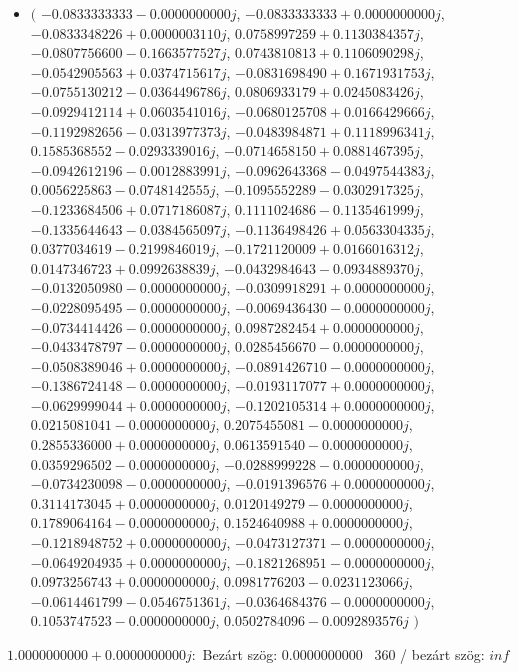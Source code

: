 \documentclass[14pt,a4paper]{article}
\begin{document}
\begin{itemize}
\item
$\big($
$-0.0833333333-0.0000000000j$, $-0.0833333333+0.0000000000j$, $-0.0833348226+0.0000003110j$, $0.0758997259+0.1130384357j$, $-0.0807756600-0.1663577527j$, $0.0743810813+0.1106090298j$, $-0.0542905563+0.0374715617j$, $-0.0831698490+0.1671931753j$, $-0.0755130212-0.0364496786j$, $0.0806933179+0.0245083426j$, $-0.0929412114+0.0603541016j$, $-0.0680125708+0.0166429666j$, $-0.1192982656-0.0313977373j$, $-0.0483984871+0.1118996341j$, $0.1585368552-0.0293339016j$, $-0.0714658150+0.0881467395j$, $-0.0942612196-0.0012883991j$, $-0.0962643368-0.0497544383j$, $0.0056225863-0.0748142555j$, $-0.1095552289-0.0302917325j$, $-0.1233684506+0.0717186087j$, $0.1111024686-0.1135461999j$, $-0.1335644643-0.0384565097j$, $-0.1136498426+0.0563304335j$, $0.0377034619-0.2199846019j$, $-0.1721120009+0.0166016312j$, $0.0147346723+0.0992638839j$, $-0.0432984643-0.0934889370j$, $-0.0132050980-0.0000000000j$, $-0.0309918291+0.0000000000j$, $-0.0228095495-0.0000000000j$, $-0.0069436430-0.0000000000j$, $-0.0734414426-0.0000000000j$, $0.0987282454+0.0000000000j$, $-0.0433478797-0.0000000000j$, $0.0285456670-0.0000000000j$, $-0.0508389046+0.0000000000j$, $-0.0891426710-0.0000000000j$, $-0.1386724148-0.0000000000j$, $-0.0193117077+0.0000000000j$, $-0.0629999044+0.0000000000j$, $-0.1202105314+0.0000000000j$, $0.0215081041-0.0000000000j$, $0.2075455081-0.0000000000j$, $0.2855336000+0.0000000000j$, $0.0613591540-0.0000000000j$, $0.0359296502-0.0000000000j$, $-0.0288999228-0.0000000000j$, $-0.0734230098-0.0000000000j$, $-0.0191396576+0.0000000000j$, $0.3114173045+0.0000000000j$, $0.0120149279-0.0000000000j$, $0.1789064164-0.0000000000j$, $0.1524640988+0.0000000000j$, $-0.1218948752+0.0000000000j$, $-0.0473127371-0.0000000000j$, $-0.0649204935+0.0000000000j$, $-0.1821268951-0.0000000000j$, $0.0973256743+0.0000000000j$, $0.0981776203-0.0231123066j$, $-0.0614461799-0.0546751361j$, $-0.0364684376-0.0000000000j$, $0.1053747523-0.0000000000j$, $0.0502784096-0.0092893576j$
$\big)$
\end{itemize}
$1.0000000000+0.0000000000j$:\
Bezárt szög: $0.0000000000$ \
360 / bezárt szög: $inf$\
\end{document}
